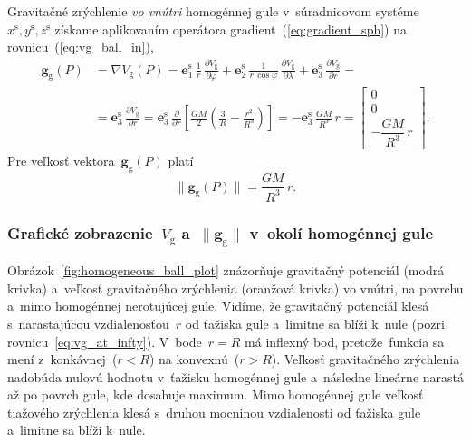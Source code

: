 \documentclass[a4paper, 12pt]{book}
\newcommand{\gidx}{\mathrm g}
\let\vec\mathbf
\begin{document}
Gravitačné zrýchlenie \emph{vo vnútri} homogénnej gule v~súradnicovom 
systéme~$x^\mathrm{s}, y^\mathrm{s}, z^\mathrm{s}$ získame aplikovaním 
operátora gradient~(\ref{eq:gradient_sph}) na rovnicu~(\ref{eq:vg_ball_in}),
%
\begin{equation}
\begin{split}
\vec g_\gidx(P) &= \nabla V_\gidx(P) = \vec e_1^\mathrm{s} \, \frac{1}{r} \, 
\frac{\partial V_\gidx}{\partial \varphi} + \vec e_2^\mathrm{s} \, \frac{1}{r 
\, \cos\varphi} \, \frac{\partial V_\gidx}{\partial \lambda} + \vec 
e_3^\mathrm{s} \, \frac{\partial V_\gidx}{\partial r} =\\
%
&=\vec e_3^\mathrm{s} \, \frac{\partial V_\gidx}{\partial r} = \vec 
e_3^\mathrm{s} \, \frac{\partial}{\partial r}\left[ \frac{GM}{2} \left( 
\frac{3}{R} - \frac{r^2}{R^3} \right) \right] = -\vec e_3^\mathrm{s} \, 
\frac{GM}{R^3} \, r
%
=
%
\begin{bmatrix}
0\\
0\\
-\dfrac{GM}{R^3} \, r
\end{bmatrix}
%
{.}
\end{split}
\end{equation}
%
Pre veľkosť vektora~$\vec g_\gidx(P)$ platí
%
\begin{equation}
\| \vec g_\gidx(P) \| = \frac{GM}{R^3} \, r{.}
\end{equation}

\subsubsection{Grafické zobrazenie~$V_\gidx$ a~$\| \vec g_\gidx \|$ v~okolí 
homogénnej gule}

Obrázok~\ref{fig:homogeneous_ball_plot} znázorňuje gravitačný potenciál (modrá 
krivka) a~veľkosť gravitačného zrýchlenia (oranžová krivka) vo vnútri, na 
povrchu a~mimo homogénnej nerotujúcej gule.  Vidíme, že gravitačný potenciál 
klesá s~narastajúcou vzdialenosťou~$r$ od ťažiska gule a~limitne sa blíži 
k~nule (pozri rovnicu~\ref{eq:vg_at_infty}).  V~bode~$r = R$ má inflexný bod, 
pretože~funkcia sa mení z~konkávnej~($r < R$) na konvexnú~($r > R$).  Veľkosť 
gravitačného zrýchlenia nadobúda nulovú hodnotu v~ťažisku homogénnej gule 
a~následne lineárne narastá až po povrch gule, kde dosahuje maximum.  Mimo 
homogénnej gule veľkosť tiažového zrýchlenia klesá s~druhou mocninou 
vzdialenosti od ťažiska gule a~limitne sa blíži k~nule.
\end{document}
